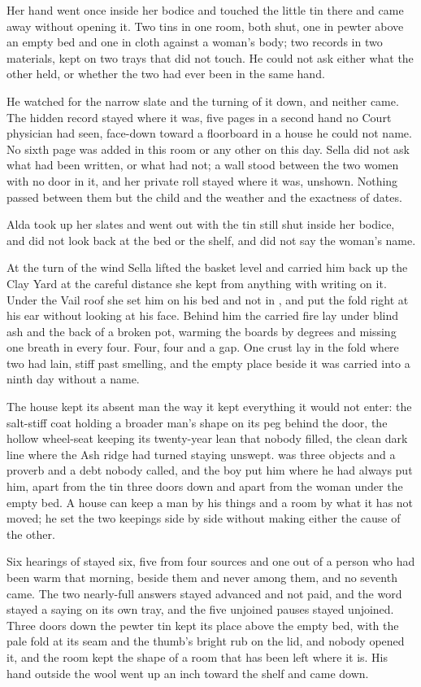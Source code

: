 Her hand went once inside her bodice and touched the little tin there and came away without opening it. Two tins in one room, both shut, one in pewter above an empty bed and one in cloth against a woman's body; two records in two materials, kept on two trays that did not touch. He could not ask either what the other held, or whether the two had ever been in the same hand.

He watched for the narrow slate and the turning of it down, and neither came. The hidden record stayed where it was, five pages in a second hand no Court physician had seen, face-down toward a floorboard in a house he could not name. No sixth page was added in this room or any other on this day. Sella did not ask what had been written, or what had not; a wall stood between the two women with no door in it, and her private roll stayed where it was, unshown. Nothing passed between them but the child and the weather and the exactness of dates.

Alda took up her slates and went out with the tin still shut inside her bodice, and did not look back at the bed or the shelf, and did not say the woman's name.

\scenebreak

At the turn of the wind Sella lifted the basket level and carried him back up the Clay Yard at the careful distance she kept from anything with writing on it. Under the Vail roof she set him on his bed and not in , and put the fold right at his ear without looking at his face. Behind him the carried fire lay under blind ash and the back of a broken pot, warming the boards by degrees and missing one breath in every four. Four, four and a gap. One crust lay in the fold where two had lain, stiff past smelling, and the empty place beside it was carried into a ninth day without a name.

The house kept its absent man the way it kept everything it would not enter: the salt-stiff coat holding a broader man's shape on its peg behind the door, the hollow wheel-seat keeping its twenty-year lean that nobody filled, the clean dark line where the Ash ridge had turned staying unswept.  was three objects and a proverb and a debt nobody called, and the boy put him where he had always put him, apart from the tin three doors down and apart from the woman under the empty bed. A house can keep a man by his things and a room by what it has not moved; he set the two keepings side by side without making either the cause of the other.

Six hearings of  stayed six, five from four sources and one out of a person who had been warm that morning, beside them and never among them, and no seventh came. The two nearly-full answers stayed advanced and not paid, and the word stayed a saying on its own tray, and the five unjoined pauses stayed unjoined. Three doors down the pewter tin kept its place above the empty bed, with the pale fold at its seam and the thumb's bright rub on the lid, and nobody opened it, and the room kept the shape of a room that has been left where it is. His hand outside the wool went up an inch toward the shelf and came down.
